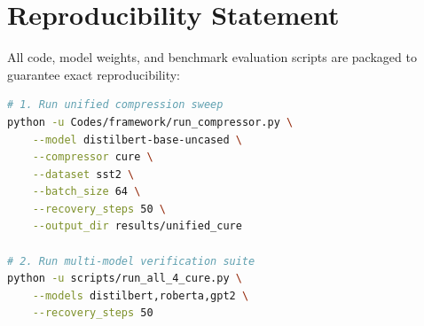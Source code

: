\section{Reproducibility Statement}
All code, model weights, and benchmark evaluation scripts are packaged to guarantee exact reproducibility:
\begin{lstlisting}[language=bash]
# 1. Run unified compression sweep
python -u Codes/framework/run_compressor.py \
    --model distilbert-base-uncased \
    --compressor cure \
    --dataset sst2 \
    --batch_size 64 \
    --recovery_steps 50 \
    --output_dir results/unified_cure

# 2. Run multi-model verification suite
python -u scripts/run_all_4_cure.py \
    --models distilbert,roberta,gpt2 \
    --recovery_steps 50
\end{lstlisting}
